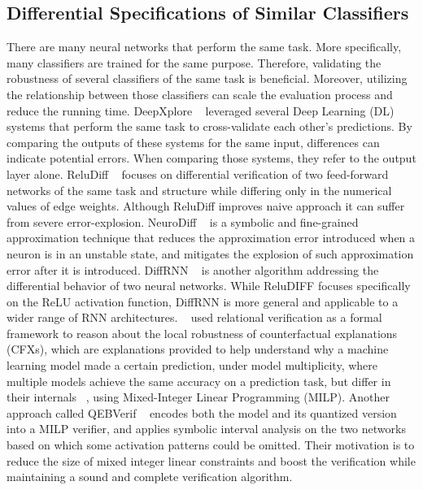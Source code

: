 \subsection{Differential Specifications of Similar Classifiers}
There are many neural networks that perform the same task. More specifically, many classifiers are trained for the same purpose. Therefore, validating the robustness of several classifiers of the same task is beneficial. Moreover, utilizing the relationship between those classifiers can scale the evaluation process and reduce the running time. DeepXplore ~\cite{DEEPXPLORE} leveraged several Deep Learning (DL) systems that perform the same task to cross-validate each other’s predictions. By comparing the outputs of these systems for the same input, differences can indicate potential errors. When comparing those systems, they refer to the output layer alone. ReluDiff ~\cite{RELUDIFF} focuses on differential verification of two feed-forward networks of the same task and structure while differing only in the numerical values of edge weights. Although ReluDiff improves naive approach it can suffer from severe error-explosion.   NeuroDiff ~\cite{NEURODIFF} is a symbolic and fine-grained approximation technique that reduces the approximation error introduced when a neuron is in an unstable state, and mitigates the explosion of such approximation error after
it is introduced. DiffRNN ~\cite{DIFFRNN} is another algorithm addressing the differential behavior of two neural networks. While ReluDIFF focuses specifically on the ReLU activation function, DiffRNN is more general and applicable to a wider range of RNN architectures. ~\cite{CFXROBUSTNESS} used relational verification as a formal framework to reason about the local robustness of counterfactual explanations (CFXs), which are explanations provided to help understand why a machine learning model made a certain prediction, under model multiplicity, where multiple models achieve the same accuracy on a prediction task, but differ in their internals ~\cite{PREDICTIVEMULTIPICITY}, using Mixed-Integer Linear Programming (MILP). Another approach called QEBVerif ~\cite{QEBVERIF} encodes both the model and its quantized version into a MILP verifier, and applies symbolic interval analysis on the two networks based on which some activation patterns could be omitted. Their motivation is to reduce the size of mixed integer linear constraints and boost the verification while maintaining a sound and complete verification algorithm. 